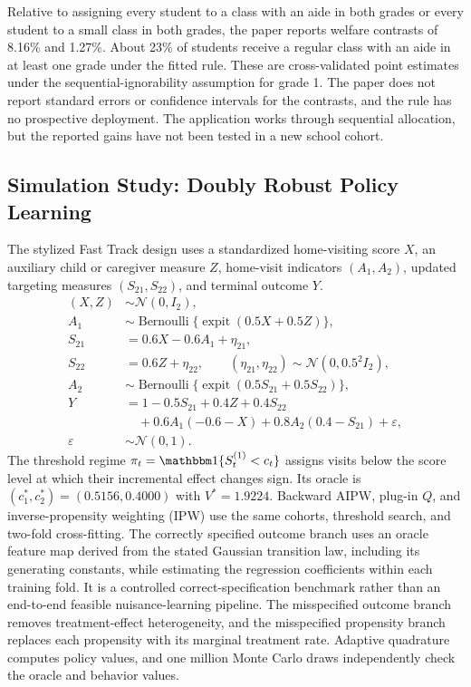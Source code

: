 Relative to assigning every student to a class with an aide in both grades or every student to a small class in both grades, the paper reports welfare contrasts of 8.16\% and 1.27\%. About 23\% of students receive a regular class with an aide in at least one grade under the fitted rule. These are cross-validated point estimates under the sequential-ignorability assumption for grade 1. The paper does not report standard errors or confidence intervals for the contrasts, and the rule has no prospective deployment. The application works through sequential allocation, but the reported gains have not been tested in a new school cohort.

\subsection{Simulation Study: Doubly Robust Policy Learning}
\label{subsec:sim_policy_learning}

The stylized Fast Track design uses a standardized home-visiting score $X$, an auxiliary child or caregiver measure $Z$, home-visit indicators $(A_1,A_2)$, updated targeting measures $(S_{21},S_{22})$, and terminal outcome $Y$.
\begin{align*}
(X,Z)&\sim\mathcal N(0,I_2),\\
A_1&\sim\operatorname{Bernoulli}
\{\operatorname{expit}(0.5X+0.5Z)\},\\
S_{21}&=0.6X-0.6A_1+\eta_{21},\\
S_{22}&=0.6Z+\eta_{22},\qquad
(\eta_{21},\eta_{22})\sim\mathcal N(0,0.5^2I_2),\\
A_2&\sim\operatorname{Bernoulli}
\{\operatorname{expit}(0.5S_{21}+0.5S_{22})\},\\
Y&=1-0.5S_{21}+0.4Z+0.4S_{22}
\\
&\quad+0.6A_1(-0.6-X)+0.8A_2(0.4-S_{21})+\varepsilon,\\
\varepsilon&\sim\mathcal N(0,1).
\end{align*}
The threshold regime $\pi_t=\mathbbm 1\{S_t^{(1)}<c_t\}$ assigns visits below the score level at which their incremental effect changes sign. Its oracle is $(c_1^*,c_2^*)=(0.5156,0.4000)$ with $V^*=1.9224$. Backward AIPW, plug-in $Q$, and inverse-propensity weighting (IPW) use the same cohorts, threshold search, and two-fold cross-fitting. The correctly specified outcome branch uses an oracle feature map derived from the stated Gaussian transition law, including its generating constants, while estimating the regression coefficients within each training fold. It is a controlled correct-specification benchmark rather than an end-to-end feasible nuisance-learning pipeline. The misspecified outcome branch removes treatment-effect heterogeneity, and the misspecified propensity branch replaces each propensity with its marginal treatment rate. Adaptive quadrature computes policy values, and one million Monte Carlo draws independently check the oracle and behavior values.

